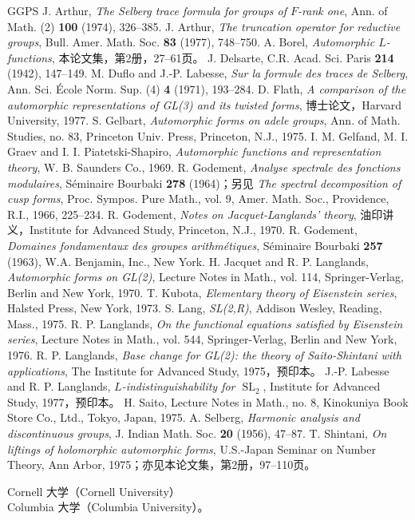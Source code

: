 \begin{thebibliography}{GGPS}
 J. Arthur, \emph{The Selberg trace formula for groups of $F$-rank one}, Ann. of Math. (2) \textbf{100} (1974), 326--385.
 J. Arthur, \emph{The truncation operator for reductive groups}, Bull. Amer. Math. Soc. \textbf{83} (1977), 748--750.
 A. Borel, \emph{Automorphic $L$-functions}, 本论文集，第2册，27--61页。
 J. Delsarte, C.R. Acad. Sci. Paris \textbf{214} (1942), 147--149.
 M. Duflo and J.-P. Labesse, \emph{Sur la formule des traces de Selberg}, Ann. Sci. École Norm. Sup. (4) \textbf{4} (1971), 193--284.
 D. Flath, \emph{A comparison of the automorphic representations of GL(3) and its twisted forms}, 博士论文，Harvard University, 1977.
 S. Gelbart, \emph{Automorphic forms on adele groups}, Ann. of Math. Studies, no. 83, Princeton Univ. Press, Princeton, N.J., 1975.
 I. M. Gelfand, M. I. Graev and I. I. Piatetski-Shapiro, \emph{Automorphic functions and representation theory}, W. B. Saunders Co., 1969.
 R. Godement, \emph{Analyse spectrale des fonctions modulaires}, Séminaire Bourbaki \textbf{278} (1964)；另见 \emph{The spectral decomposition of cusp forms}, Proc. Sympos. Pure Math., vol. 9, Amer. Math. Soc., Providence, R.I., 1966, 225--234.
 R. Godement, \emph{Notes on Jacquet-Langlands' theory}, 油印讲义，Institute for Advanced Study, Princeton, N.J., 1970.
 R. Godement, \emph{Domaines fondamentaux des groupes arithmétiques}, Séminaire Bourbaki \textbf{257} (1963), W.A. Benjamin, Inc., New York.
 H. Jacquet and R. P. Langlands, \emph{Automorphic forms on GL(2)}, Lecture Notes in Math., vol. 114, Springer-Verlag, Berlin and New York, 1970.
 T. Kubota, \emph{Elementary theory of Eisenstein series}, Halsted Press, New York, 1973.
 S. Lang, \emph{SL(2,R)}, Addison Wesley, Reading, Mass., 1975.
 R. P. Langlands, \emph{On the functional equations satisfied by Eisenstein series}, Lecture Notes in Math., vol. 544, Springer-Verlag, Berlin and New York, 1976.
 R. P. Langlands, \emph{Base change for GL(2): the theory of Saito-Shintani with applications}, The Institute for Advanced Study, 1975，预印本。
 J.-P. Labesse and R. P. Langlands, \emph{$L$-indistinguishability for $\operatorname{SL}_2$}, Institute for Advanced Study, 1977，预印本。
 H. Saito, Lecture Notes in Math., no. 8, Kinokuniya Book Store Co., Ltd., Tokyo, Japan, 1975.
 A. Selberg, \emph{Harmonic analysis and discontinuous groups}, J. Indian Math. Soc. \textbf{20} (1956), 47--87.
 T. Shintani, \emph{On liftings of holomorphic automorphic forms}, U.S.-Japan Seminar on Number Theory, Ann Arbor, 1975；亦见本论文集，第2册，97--110页。
\end{thebibliography}

\noindent Cornell 大学（Cornell University）\\
Columbia 大学（Columbia University）。
